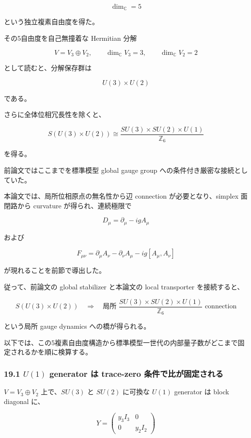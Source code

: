 \documentclass[
  a4paper,
]{ltjsarticle}
\begin{document}
\[
\boxed{
\dim_{\mathbb C}=5
}
\tag{95}
\]

という独立複素自由度を得た。

その5自由度を自己無撞着な Hermitian 分解

\[
\boxed{
V=V_3\oplus V_2,
\qquad
\dim_{\mathbb C}V_3=3,
\qquad
\dim_{\mathbb C}V_2=2
}
\tag{96}
\]

として読むと、分解保存群は

\[
U(3)\times U(2)
\]

である。

さらに全体位相冗長性を除くと、

\[
\boxed{
S(U(3)\times U(2))
\cong
\frac{
SU(3)\times SU(2)\times U(1)
}{
\mathbb Z_6
}
}
\tag{97}
\]

を得る。

前論文ではここまでを標準模型 global gauge group
への条件付き厳密な接続としていた。

本論文では、局所位相原点の無名性から辺 connection が必要となり、simplex
面閉路から curvature が得られ、連続極限で

\[
D_\mu
=
\partial_\mu-igA_\mu
\]

および

\[
F_{\mu\nu}
=
\partial_\mu A_\nu-\partial_\nu A_\mu-ig[A_\mu,A_\nu]
\]

が現れることを前節で導出した。

従って、前論文の global stabilizer と本論文の local transporter
を接続すると、

\[
\boxed{
S(U(3)\times U(2))
\quad\Longrightarrow\quad
\text{局所 }
\frac{SU(3)\times SU(2)\times U(1)}{\mathbb Z_6}
\text{ connection}
}
\tag{98}
\]

という局所 gauge dynamics への橋が得られる。

以下では、この5複素自由度構造から標準模型一世代の内部量子数がどこまで固定されるかを順に検算する。

\subsubsection{\texorpdfstring{19.1 \(U(1)\) generator は trace-zero
条件で比が固定される}{19.1 U(1) generator は trace-zero 条件で比が固定される}}\label{u1-generator-ux306f-trace-zero-ux6761ux4ef6ux3067ux6bd4ux304cux56faux5b9aux3055ux308cux308b}

\(V=V_3\oplus V_2\) 上で、\(SU(3)\) と \(SU(2)\) に可換な \(U(1)\)
generator は block diagonal に、

\[
Y
=
\begin{pmatrix}
y_3 I_3 & 0\\
0 & y_2 I_2
\end{pmatrix}
\tag{99}
\]
\end{document}
